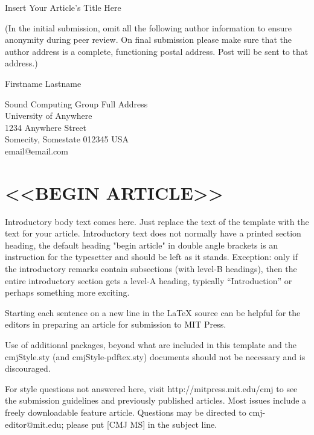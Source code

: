 \documentclass[letterpaper, 12pt]{article}
\begin{document}
{\cmjTitle Insert Your Article's Title Here}
\vspace*{24pt}

(In the initial submission, omit all the following author information to ensure anonymity during peer review.
On final submission please make sure that the author address is a complete, functioning postal address.
Post will be sent to that address.)

{\cmjAuthor Firstname Lastname}	%
 
\begin{cmjAuthorAddress}
	Sound Computing Group Full Address\\
	University of Anywhere\\
	1234 Anywhere Street\\
	Somecity, Somestate 012345 USA\\		%
	email@email.com
\end{cmjAuthorAddress}


\begin{abstract}
Insert abstract here, typically about 150--200 words.
\end{abstract}

\section{<<BEGIN ARTICLE>>}
Introductory body text comes here. 
Just replace the text of the template with the text for your article.
Introductory text does not normally have a printed section heading, the default heading "begin article" in double angle brackets is an instruction for the typesetter and should be left as it stands.
Exception: only if the introductory remarks contain subsections (with level-B headings), then the entire introductory section gets a level-A heading, typically ``Introduction'' or perhaps something more exciting.

Starting each sentence on a new line in the LaTeX source can be helpful for the editors in preparing an article for submission to MIT Press.

Use of additional packages, beyond what are included in this template and the cmjStyle.sty (and cmjStyle-pdftex.sty) documents should not be necessary and is discouraged. 

For style questions not answered here, visit http://mitpress.mit.edu/cmj to see the submission guidelines and previously published articles.  
Most issues include a freely downloadable feature article.  
Questions may be directed to cmj-editor@mit.edu; please put [CMJ MS] in the subject line.
\end{document}
